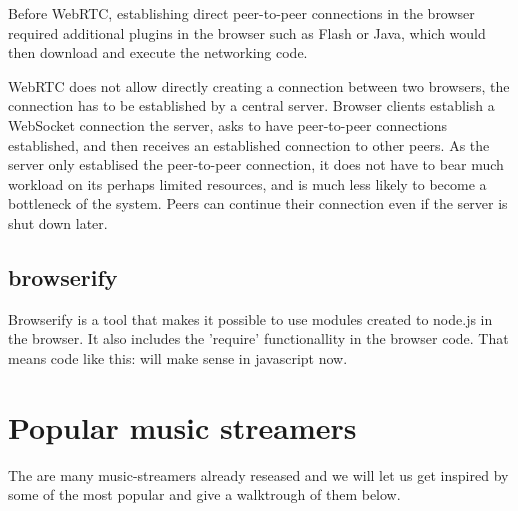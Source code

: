 Before WebRTC, establishing direct peer-to-peer connections in the browser required
additional plugins in the browser such as Flash or Java, which would then download and
execute the networking code.

\label{webrtc-connection-server}
WebRTC does not allow directly creating a connection between two browsers, 
the connection has to be established by a central server.
Browser clients establish a WebSocket connection the server, 
asks to have peer-to-peer connections established,
and then receives an established connection to other peers.
As the server only establised the peer-to-peer connection, 
it does not have to bear much workload on its perhaps limited resources,
and is much less likely to become a bottleneck of the system.
Peers can continue their connection even if the server is shut down later.

\section{browserify}
Browserify is a tool that makes it possible to use modules created to node.js in the browser. It also includes the 'require' functionallity in the browser code. That means code like this:
will make sense in javascript now.

\chapter{Popular music streamers}
The are many music-streamers already reseased and we will let us get inspired by some of the most popular and give a walktrough of them below.

